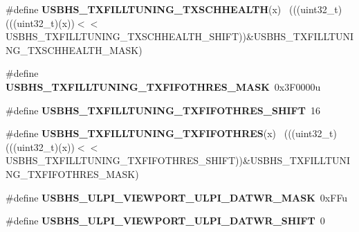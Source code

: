 \begin{DoxyCompactItemize}
\item 
\hypertarget{group___u_s_b_h_s___register___masks_gac36504c0e6e65ed06fbb7d9cfec1120b}{}\#define {\bfseries U\+S\+B\+H\+S\+\_\+\+T\+X\+F\+I\+L\+L\+T\+U\+N\+I\+N\+G\+\_\+\+T\+X\+S\+C\+H\+H\+E\+A\+L\+T\+H}(x)            ~(((uint32\+\_\+t)(((uint32\+\_\+t)(x))$<$$<$U\+S\+B\+H\+S\+\_\+\+T\+X\+F\+I\+L\+L\+T\+U\+N\+I\+N\+G\+\_\+\+T\+X\+S\+C\+H\+H\+E\+A\+L\+T\+H\+\_\+\+S\+H\+I\+F\+T))\&U\+S\+B\+H\+S\+\_\+\+T\+X\+F\+I\+L\+L\+T\+U\+N\+I\+N\+G\+\_\+\+T\+X\+S\+C\+H\+H\+E\+A\+L\+T\+H\+\_\+\+M\+A\+S\+K)\label{group___u_s_b_h_s___register___masks_gac36504c0e6e65ed06fbb7d9cfec1120b}

\item 
\hypertarget{group___u_s_b_h_s___register___masks_gaf0f4f42e293d4f3c41cc55c796ed6a70}{}\#define {\bfseries U\+S\+B\+H\+S\+\_\+\+T\+X\+F\+I\+L\+L\+T\+U\+N\+I\+N\+G\+\_\+\+T\+X\+F\+I\+F\+O\+T\+H\+R\+E\+S\+\_\+\+M\+A\+S\+K}~0x3\+F0000u\label{group___u_s_b_h_s___register___masks_gaf0f4f42e293d4f3c41cc55c796ed6a70}

\item 
\hypertarget{group___u_s_b_h_s___register___masks_gad267c1c63361ba70a6fab03f485d65f5}{}\#define {\bfseries U\+S\+B\+H\+S\+\_\+\+T\+X\+F\+I\+L\+L\+T\+U\+N\+I\+N\+G\+\_\+\+T\+X\+F\+I\+F\+O\+T\+H\+R\+E\+S\+\_\+\+S\+H\+I\+F\+T}~16\label{group___u_s_b_h_s___register___masks_gad267c1c63361ba70a6fab03f485d65f5}

\item 
\hypertarget{group___u_s_b_h_s___register___masks_gae0982bdaf486b4d71f6e5606d16aeae2}{}\#define {\bfseries U\+S\+B\+H\+S\+\_\+\+T\+X\+F\+I\+L\+L\+T\+U\+N\+I\+N\+G\+\_\+\+T\+X\+F\+I\+F\+O\+T\+H\+R\+E\+S}(x)            ~(((uint32\+\_\+t)(((uint32\+\_\+t)(x))$<$$<$U\+S\+B\+H\+S\+\_\+\+T\+X\+F\+I\+L\+L\+T\+U\+N\+I\+N\+G\+\_\+\+T\+X\+F\+I\+F\+O\+T\+H\+R\+E\+S\+\_\+\+S\+H\+I\+F\+T))\&U\+S\+B\+H\+S\+\_\+\+T\+X\+F\+I\+L\+L\+T\+U\+N\+I\+N\+G\+\_\+\+T\+X\+F\+I\+F\+O\+T\+H\+R\+E\+S\+\_\+\+M\+A\+S\+K)\label{group___u_s_b_h_s___register___masks_gae0982bdaf486b4d71f6e5606d16aeae2}

\item 
\hypertarget{group___u_s_b_h_s___register___masks_gaa18ecb634815ce900c82a8aaf7eac021}{}\#define {\bfseries U\+S\+B\+H\+S\+\_\+\+U\+L\+P\+I\+\_\+\+V\+I\+E\+W\+P\+O\+R\+T\+\_\+\+U\+L\+P\+I\+\_\+\+D\+A\+T\+W\+R\+\_\+\+M\+A\+S\+K}~0x\+F\+Fu\label{group___u_s_b_h_s___register___masks_gaa18ecb634815ce900c82a8aaf7eac021}

\item 
\hypertarget{group___u_s_b_h_s___register___masks_ga5b014273a391d82e6fb78dda4b1ef111}{}\#define {\bfseries U\+S\+B\+H\+S\+\_\+\+U\+L\+P\+I\+\_\+\+V\+I\+E\+W\+P\+O\+R\+T\+\_\+\+U\+L\+P\+I\+\_\+\+D\+A\+T\+W\+R\+\_\+\+S\+H\+I\+F\+T}~0\label{group___u_s_b_h_s___register___masks_ga5b014273a391d82e6fb78dda4b1ef111}


\end{DoxyCompactItemize}
